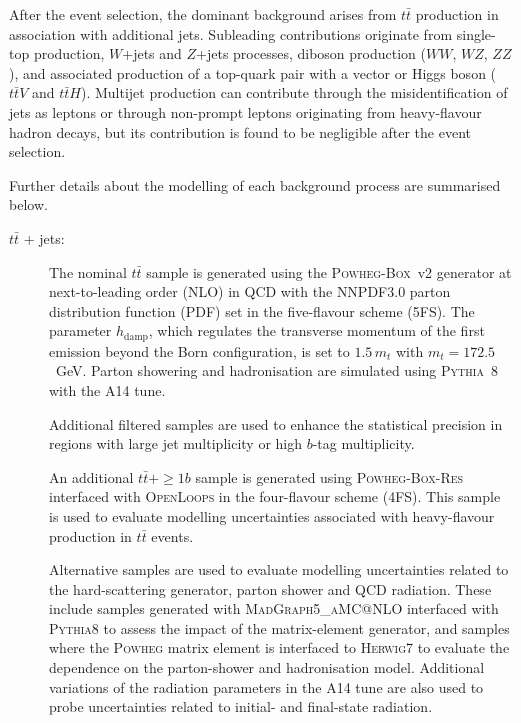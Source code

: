﻿After the event selection, the dominant background arises from
$t\bar{t}$ production in association with additional jets.
Subleading contributions originate from single-top production,
$W$+jets and $Z$+jets processes, diboson production ($WW$, $WZ$, $ZZ$),
and associated production of a top-quark pair with a vector or Higgs boson
($t\bar{t}V$ and $t\bar{t}H$).
Multijet production can contribute through the misidentification of jets
as leptons or through non-prompt leptons originating from heavy-flavour
hadron decays, but its contribution is found to be negligible after the
event selection.

Further details about the modelling of each background process are
summarised below.

\begin{description}

\item[\boldmath$t\bar{t}$ + jets:] 

The nominal $t\bar{t}$ sample is generated using the
\textsc{Powheg-Box}~v2 generator at next-to-leading order (NLO)
in QCD with the \textsc{NNPDF3.0} parton distribution function (PDF)
set in the five-flavour scheme (5FS).
The parameter $h_{\mathrm{damp}}$, which regulates the transverse
momentum of the first emission beyond the Born configuration,
is set to $1.5\,m_t$ with $m_t = 172.5$~GeV.
Parton showering and hadronisation are simulated using
\textsc{Pythia}~8 with the A14 tune.

Additional filtered samples are used to enhance the statistical
precision in regions with large jet multiplicity or high
$b$-tag multiplicity.

An additional $t\bar{t}+\geq 1b$ sample is generated using
\textsc{Powheg-Box-Res} interfaced with \textsc{OpenLoops}
in the four-flavour scheme (4FS).
This sample is used to evaluate modelling uncertainties
associated with heavy-flavour production in $t\bar{t}$ events.

Alternative samples are used to evaluate modelling uncertainties
related to the hard-scattering generator, parton shower and QCD
radiation.
These include samples generated with
\textsc{MadGraph5\_aMC@NLO} interfaced with \textsc{Pythia8}
to assess the impact of the matrix-element generator,
and samples where the \textsc{Powheg} matrix element is interfaced
to \textsc{Herwig7} to evaluate the dependence on the
parton-shower and hadronisation model.
Additional variations of the radiation parameters in the
A14 tune are also used to probe uncertainties related to
initial- and final-state radiation.


\end{description}
